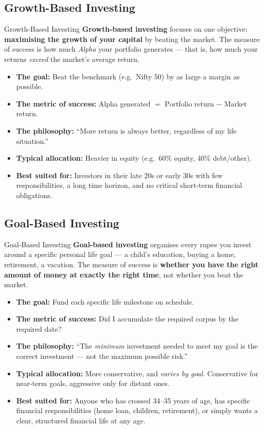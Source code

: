 \documentclass[12pt,a4paper]{article}
\begin{document}
\subsection{Growth-Based Investing}

\begin{definitionbox}{Growth-Based Investing}
\textbf{Growth-based investing} focuses on one objective: \textbf{maximising the growth of your capital} by beating the market. The measure of success is how much \textit{Alpha} your portfolio generates --- that is, how much your returns \textit{exceed} the market's average return.
\end{definitionbox}

\begin{itemize}
  \item \textbf{The goal:} Beat the benchmark (e.g.\ Nifty 50) by as large a margin as possible.
  \item \textbf{The metric of success:} Alpha generated $=$ Portfolio return $-$ Market return.
  \item \textbf{The philosophy:} ``More return is always better, regardless of my life situation.''
  \item \textbf{Typical allocation:} Heavier in equity (e.g.\ 60\% equity, 40\% debt/other).
  \item \textbf{Best suited for:} Investors in their late 20s or early 30s with few responsibilities, a long time horizon, and no critical short-term financial obligations.
\end{itemize}

\subsection{Goal-Based Investing}

\begin{definitionbox}{Goal-Based Investing}
\textbf{Goal-based investing} organises every rupee you invest around a specific personal life goal --- a child's education, buying a home, retirement, a vacation. The measure of success is \textbf{whether you have the right amount of money at exactly the right time}, not whether you beat the market.
\end{definitionbox}

\begin{itemize}
  \item \textbf{The goal:} Fund each specific life milestone on schedule.
  \item \textbf{The metric of success:} Did I accumulate the required corpus by the required date?
  \item \textbf{The philosophy:} ``The \textit{minimum} investment needed to meet my goal is the correct investment --- not the maximum possible risk.''
  \item \textbf{Typical allocation:} More conservative, and \textit{varies by goal}. Conservative for near-term goals, aggressive only for distant ones.
  \item \textbf{Best suited for:} Anyone who has crossed 34--35 years of age, has specific financial responsibilities (home loan, children, retirement), or simply wants a clear, structured financial life at any age.
\end{itemize}
\end{document}
